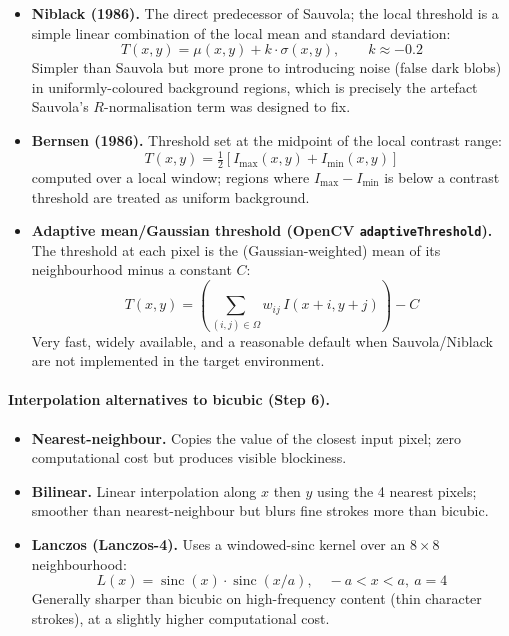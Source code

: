 \documentclass[12pt, a4paper]{article}
\begin{document}
\begin{itemize}
  \item \textbf{Niblack (1986).} The direct predecessor of Sauvola; the local threshold is a simple linear combination of the local mean and standard deviation:
  \[
  T(x,y) = \mu(x,y) + k \cdot \sigma(x,y), \qquad k \approx -0.2
  \]
  Simpler than Sauvola but more prone to introducing noise (false dark blobs) in uniformly-coloured background regions, which is precisely the artefact Sauvola's $R$-normalisation term was designed to fix.

  \item \textbf{Bernsen (1986).} Threshold set at the midpoint of the local contrast range:
  \[
  T(x,y) = \tfrac{1}{2}\left[ I_{\max}(x,y) + I_{\min}(x,y) \right]
  \]
  computed over a local window; regions where $I_{\max}-I_{\min}$ is below a contrast threshold are treated as uniform background.

  \item \textbf{Adaptive mean/Gaussian threshold (OpenCV \texttt{adaptiveThreshold}).} The threshold at each pixel is the (Gaussian-weighted) mean of its neighbourhood minus a constant $C$:
  \[
  T(x,y) = \left(\sum_{(i,j)\in\Omega} w_{ij}\, I(x{+}i, y{+}j)\right) - C
  \]
  Very fast, widely available, and a reasonable default when Sauvola/Niblack are not implemented in the target environment.
\end{itemize}

\paragraph{Interpolation alternatives to bicubic (Step 6).}

\begin{itemize}
  \item \textbf{Nearest-neighbour.} Copies the value of the closest input pixel; zero computational cost but produces visible blockiness.
  \item \textbf{Bilinear.} Linear interpolation along $x$ then $y$ using the 4 nearest pixels; smoother than nearest-neighbour but blurs fine strokes more than bicubic.
  \item \textbf{Lanczos (Lanczos-4).} Uses a windowed-sinc kernel over an $8\times 8$ neighbourhood:
  \[
  L(x) = \operatorname{sinc}(x)\cdot\operatorname{sinc}(x/a), \quad -a < x < a,\ a=4
  \]
  Generally sharper than bicubic on high-frequency content (thin character strokes), at a slightly higher computational cost.
\end{itemize}
\end{document}

